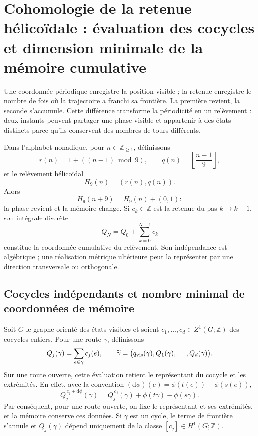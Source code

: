 \chapter{Cohomologie de la retenue hélicoïdale : évaluation des cocycles et dimension minimale de la mémoire cumulative}
\label{chap:elevacion-cohomologica-dimension-rev2}

Une coordonnée périodique enregistre la position visible ; la retenue enregistre
le nombre de fois où la trajectoire a franchi sa frontière. La première revient,
la seconde s'accumule. Cette différence transforme la périodicité en un
relèvement : deux instants peuvent partager une phase visible et appartenir à des états
distincts parce qu'ils conservent des nombres de tours différents.

Dans l'alphabet nonadique, pour \(n\in\mathbb Z_{\geq1}\), définissons
\[
 r(n)=1+((n-1)\bmod9),
 \qquad
 q(n)=\left\lfloor\frac{n-1}{9}\right\rfloor,
\]
et le relèvement hélicoïdal
\begin{equation}
 H_9(n)=(r(n),q(n)).
 \label{eq:elevacion-helicoidal-nonadica-rev2}
\end{equation}
Alors
\[
 H_9(n+9)=H_9(n)+(0,1):
\]
la phase revient et la mémoire change. Si \(c_k\in\mathbb Z\) est la retenue
du pas \(k\to k+1\), son intégrale discrète
\begin{equation}
 Q_N=Q_0+\sum_{k=0}^{N-1}c_k
 \label{eq:integral-discreta-carry-rev2}
\end{equation}
constitue la coordonnée cumulative du relèvement. Son indépendance est
algébrique ; une réalisation métrique ultérieure peut la représenter par
une direction transversale ou orthogonale.

\section{Cocycles indépendants et nombre minimal de coordonnées de mémoire}

Soit \(G\) le graphe orienté des états visibles et soient
\(c_1,\ldots,c_d\in Z^1(G;\mathbb Z)\) des cocycles entiers. Pour une route
\(\gamma\), définissons
\[
 Q_j(\gamma)=\sum_{e\in\gamma}c_j(e),
 \qquad
 \widetilde\gamma=
 \bigl(q_{\rm vis}(\gamma),Q_1(\gamma),\ldots,Q_d(\gamma)\bigr).
\]
Sur une route ouverte, cette évaluation retient le représentant du cocycle
et les extrémités. En effet, avec la convention
\((\mathrm d\phi)(e)=\phi(t(e))-\phi(s(e))\),
\begin{equation}
 Q_j^{\,c_j+\mathrm d\phi}(\gamma)
 =Q_j^{\,c_j}(\gamma)+\phi(t\gamma)-\phi(s\gamma).
 \label{eq:cambio-representante-cociclo-ruta-rev2}
\end{equation}
Par conséquent, pour une route ouverte, on fixe le représentant et ses extrémités,
et la mémoire conserve ces données. Si \(\gamma\) est un cycle, le terme de
frontière s'annule et \(Q_j(\gamma)\) dépend uniquement de la classe
\([c_j]\in H^1(G;\mathbb Z)\).

